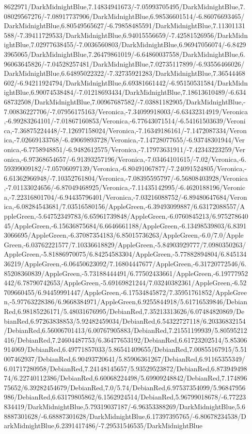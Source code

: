 {\begin{tikzternal}
8622971/DarkMidnightBlue,7.14834941673/-7.05993705495/DarkMidnightBlue,7.08029567276/-7.08917737906/DarkMidnightBlue,6.98536601514/-6.86076693465/DarkMidnightBlue,6.80549565627/-6.79858485591/DarkMidnightBlue,7.11301131588/-7.39411729533/DarkMidnightBlue,6.94015556659/-7.42581526956/DarkMidnightBlue,7.02977638455/-7.0036560803/DarkMidnightBlue,6.96947056074/-6.84293965065/DarkMidnightBlue,7.26479861019/-6.64860037558/DarkMidnightBlue,6.96063645826/-7.04528257481/DarkMidnightBlue,7.02735117899/-6.93556466026/DarkMidnightBlue,6.64895022322/-7.32735921283/DarkMidnightBlue,7.36544468602/-6.94211924794/DarkMidnightBlue,6.69381661442/-6.95150531584/DarkMidnightBlue,6.90074538484/-7.01218693434/DarkMidnightBlue,7.18613610489/-6.63468732508/DarkMidnightBlue,7.00967687582/-7.03881182905/DarkMidnightBlue,-7.00836227706/-7.07956175163/Veronica,-7.34099918003/-6.63432314919/Veronica,-6.99283264101/-7.01867160853/Veronica,-6.77643071514/-6.54161503639/Veronica,-7.36875224448/-7.12697158024/Veronica,-7.16349186161/-7.1472087334/Veronica,-7.02669133768/-6.49069893728/Veronica,-7.14728077655/-6.93748301944/Veronica,-6.7758948851/-6.9482612575/Veronica,-7.17973631911/-7.42343223259/Veronica,-6.97368654657/-6.91393257196/Veronica,-7.03464101615/-7.02/Veronica,-6.59399009182/-7.05706097139/Veronica,-6.80491067877/-7.24091524805/Veronica,-6.61362966948/-7.10352761804/Veronica,-7.08395595797/-6.56808403928/Veronica,-7.01133024656/-6.87049468925/Veronica,-7.11435142995/-6.4620188196/Veronica,-7.22316801704/-6.94435796401/Veronica,-7.03216088752/-6.89480647684/Veronica,-6.08284543681/7.03516580156/AppleGreen,-6.39493099887/6.63172088557/AppleGreen,-5.64752349783/6.65961739848/AppleGreen,-6.0760845213/6.97527864045/AppleGreen,-6.15636875684/6.6646661188/AppleGreen,-6.13498539803/6.83913066695/AppleGreen,-6.37087354183/6.85015736263/AppleGreen,-6.0/7.0/AppleGreen,-6.03762221577/7.10336618829/AppleGreen,-5.84903929777/7.0980350263/AppleGreen,-5.81886970075/6.84254583304/AppleGreen,-5.77882894804/6.84513436219/AppleGreen,-6.06450623092/7.16804447677/AppleGreen,-6.31720772546/6.85208360839/AppleGreen,-5.73188444491/6.77502433661/AppleGreen,-6.19777952442/6.78790742653/AppleGreen,-5.69169821244/7.03240382361/AppleGreen,-6.52709660455/6.94459991447/AppleGreen,-6.17534845872/7.35951761852/AppleGreen,-5.97763228386/6.9668384971/AppleGreen,6.9255844918/5.61716539846/DebianRed,6.98185226171/5.48031676995/DebianRed,7.35213313626/6.07484820869/DebianRed,6.97263838853/5.92482459034/DebianRed,6.54322727118/6.20336832154/DebianRed,6.56006701413/6.00767905883/DebianRed,7.21551199939/5.80595212416/DebianRed,7.24604487753/6.36477653192/DebianRed,6.61723202514/5.85306914069/DebianRed,6.49771857033/5.86541409655/DebianRed,7.00855167915/5.51007462937/DebianRed,6.90493720641/5.85906361267/DebianRed,6.91165355349/6.01717280958/DebianRed,7.24148145657/5.93529523872/DebianRed,6.87394949874/6.22740112386/DebianRed,6.60068224498/5.69909248842/DebianRed,7.17489675652/6.39282454679/DebianRed,7.0/5.74/DebianRed,6.97537354099/5.96847956986/DebianRed,6.63179805862/6.1562924514/DebianRed,5.96799018678/-6.77223834419/DarkMidnightBlue,5.79319037187/-6.96353388269/DarkMidnightBlue,5.68887301628/-6.68887301628/DarkMidnightBlue,6.17397395765/-6.80678234538/DarkMidnightBlue,6.2391417486/-7.29531546535/DarkMidnightBlue
\end{tikzternal}}
